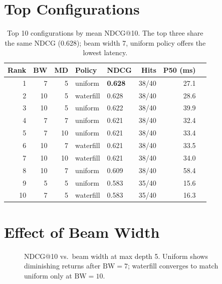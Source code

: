 \documentclass[11pt,a4paper]{article}
\begin{document}
\section{Top Configurations}

\begin{table}[h]
\centering
\footnotesize
\begin{tabular}{rrrllrrr}
\toprule
\textbf{Rank} & \textbf{BW} & \textbf{MD} & \textbf{Policy} & \textbf{NDCG} & \textbf{Hits} & \textbf{P50 (ms)} \\
\midrule
1 & 7  & 5  & uniform    & \textbf{0.628} & 38/40 & 27.1 \\
2 & 10 & 5  & waterfill  & 0.628 & 38/40 & 28.6 \\
3 & 10 & 5  & uniform    & 0.622 & 38/40 & 39.9 \\
4 & 7  & 7  & uniform    & 0.621 & 38/40 & 32.4 \\
5 & 7  & 10 & uniform    & 0.621 & 38/40 & 33.4 \\
6 & 10 & 7  & waterfill  & 0.621 & 38/40 & 33.5 \\
7 & 10 & 10 & waterfill  & 0.621 & 38/40 & 34.0 \\
8 & 10 & 7  & uniform    & 0.609 & 38/40 & 58.4 \\
9 & 5  & 5  & uniform    & 0.583 & 35/40 & 15.6 \\
10 & 7  & 5  & waterfill & 0.583 & 35/40 & 16.3 \\
\bottomrule
\end{tabular}
\caption{Top 10 configurations by mean NDCG@10. The top three share the same NDCG (0.628); beam width 7, uniform policy offers the lowest latency.}
\end{table}

\section{Effect of Beam Width}

\begin{figure}[h]
\centering
{}
\caption{NDCG@10 vs.\ beam width at max depth 5. Uniform shows diminishing returns after $\mathrm{BW}=7$; waterfill converges to match uniform only at $\mathrm{BW}=10$.}
\end{figure}
\end{document}
